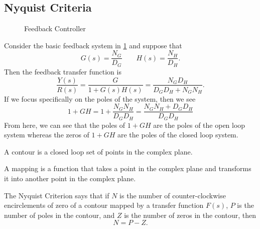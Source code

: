 \subsection{Nyquist Criteria}
\begin{gitbook-image}
\begin{figure}[H]
    \centering 
    \caption{Feedback Controller}
    \label{fig:nyquist-feedback-controller}
\end{figure}
\end{gitbook-image}
Consider the basic feedback system in \cref{fig:nyquist-feedback-controller} and suppose that
\[
  G(s) = \frac{N_G}{D_G} \qquad H(s) = \frac{N_H}{D_H}.
\]
Then the feedback transfer function is
\[
  \frac{Y(s)}{R(s)} = \frac{G}{1+G(s)H(s)} = \frac{N_GD_H}{D_GD_H + N_GN_H}.
\]
If we focus specifically on the poles of the system, then we see
\[
  1+GH = 1 + \frac{N_GN_H}{D_GD_H} = \frac{N_GN_H+D_GD_H}{D_GD_H}
\]
From here, we can see that the poles of $1+GH$ are the poles of the open loop system whereas the zeros of $1+GH$ are the poles of the closed loop system.
\begin{definition}
  A contour is a closed loop set of points in the complex plane.
  \label{defn:contour}
\end{definition}
\begin{definition}
  A mapping is a function that takes a point in the complex plane and transforms it into another point in the complex plane.
  \label{defn:mapping}
\end{definition}
\begin{definition}
  The Nyquist Criterion says that if $N$ is the number of counter-clockwise encirclements of zero of a contour mapped by a transfer function $F(s)$, $P$ is the number of poles in the contour, and $Z$ is the number of zeros in the contour, then
  \begin{equation}
	N = P - Z.
	\label{eqn:nyquist-criteria}
  \end{equation}
  \label{defn:nyquist-criteria}
\end{definition}
